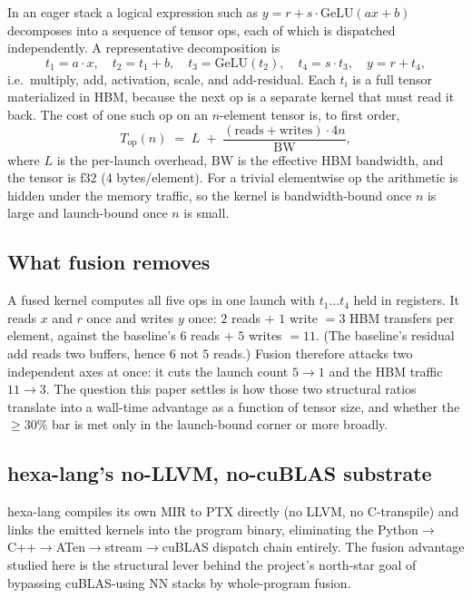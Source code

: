 \documentclass[11pt,a4paper]{article}
\begin{document}
In an eager stack a logical expression such as
$y = r + s\cdot\mathrm{GeLU}(a x + b)$ decomposes into a sequence of tensor
ops, each of which is dispatched independently. A representative decomposition
is
\[
  t_1 = a\cdot x,\quad t_2 = t_1 + b,\quad t_3 = \mathrm{GeLU}(t_2),\quad
  t_4 = s\cdot t_3,\quad y = r + t_4,
\]
i.e.\ multiply, add, activation, scale, and add-residual. Each $t_i$ is a full
tensor materialized in HBM, because the next op is a separate kernel that must
read it back. The cost of one such op on an $n$-element tensor is, to first
order,
\[
  T_{\text{op}}(n) \;=\; L \;+\; \frac{(\text{reads}+\text{writes})\cdot 4n}{\mathrm{BW}},
\]
where $L$ is the per-launch overhead, $\mathrm{BW}$ is the effective HBM
bandwidth, and the tensor is f32 (4 bytes/element). For a trivial elementwise
op the arithmetic is hidden under the memory traffic, so the kernel is
bandwidth-bound once $n$ is large and launch-bound once $n$ is small.

\subsection{What fusion removes}

A fused kernel computes all five ops in one launch with $t_1\ldots t_4$ held in
registers. It reads $x$ and $r$ once and writes $y$ once: $2$ reads $+$ $1$
write $= 3$ HBM transfers per element, against the baseline's $6$ reads $+$ $5$
writes $= 11$. (The baseline's residual add reads two buffers, hence $6$ not
$5$ reads.) Fusion therefore attacks two independent axes at once: it cuts the
launch count $5\to 1$ and the HBM traffic $11\to 3$. The question this paper
settles is how those two structural ratios translate into a wall-time
advantage as a function of tensor size, and whether the $\ge 30\%$ bar is met
only in the launch-bound corner or more broadly.

\subsection{hexa-lang's no-LLVM, no-cuBLAS substrate}

hexa-lang compiles its own MIR to PTX directly (no LLVM, no C-transpile) and
links the emitted kernels into the program binary, eliminating the
Python$\to$C++$\to$ATen$\to$stream$\to$cuBLAS dispatch chain entirely. The
fusion advantage studied here is the structural lever behind the project's
north-star goal of bypassing cuBLAS-using NN stacks by whole-program fusion.
\end{document}
